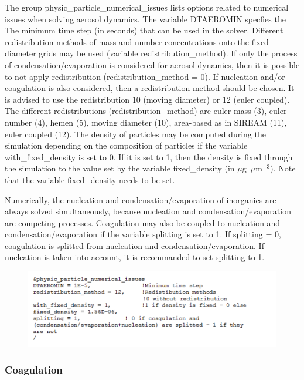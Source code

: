 \documentclass[a4paper,11pt]{article}
\begin{document}
The group physic\_particle\_numerical\_issues lists options related to numerical issues when solving aerosol dynamics. 
The variable DTAEROMIN specfies the The minimum time step (in seconds) that can be used in the solver. 
Different redistribution methods of mass and number concentrations onto the fixed diameter grids may be used (variable redistribution\_method). If only the process of condensation/evaporation is considered for aerosol dynamics, then it is possible to not apply redistribution (redistribution\_method = 0). If nucleation and/or coagulation is also considered, then a redistribution method should be chosen. It is advised to use the redistribution 10 (moving diameter) or 12 (euler coupled). The different redistributions (redistribution\_method) are euler mass (3), euler number (4), hemen (5), moving diameter (10), area-based as in SIREAM (11), euler coupled (12).
The density of particles may be computed during the simulation depending on the composition of particles if the variable with\_fixed\_density is set to 0. If it is set to 1, then the density is fixed through the simulation to the value set by the variable fixed\_density (in $\mu$g~$\mu$m$^{-3}$). Note that the variable fixed\_density needs to be set.

Numerically, the nucleation and condensation/evaporation of inorganics are always solved simultaneously, because nucleation and condensation/evaporation are competing processes. Coagulation may also be coupled to nucleation and condensation/evaporation if the variable splitting is set to 1. If splitting = 0, coagulation is splitted from nucleation and condensation/evaporation. If nucleation is taken into account, it is recommanded to set splitting to 1.

\begin{figure}[H]
        \begin{center}
                \includegraphics[angle=0,width=\textwidth]{fig/numericalissues.png}
        \end{center}
\end{figure}

\subsubsection{Coagulation}
\end{document}
